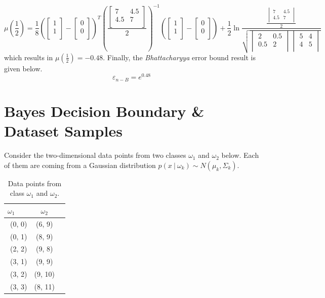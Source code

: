 \documentclass[12pt]{article}
\numberwithin{equation}{section}
\numberwithin{table}{section}
\numberwithin{figure}{section}
\newcommand{\eps}{\varepsilon}
\begin{document}
$$
	\mu(\frac{1}{2}) = \frac{1}{8}(\begin{bmatrix}
	1\\
	1\\
	\end{bmatrix} - \begin{bmatrix}
	0\\
	0\\
	\end{bmatrix})^T(\frac{\begin{bmatrix}
		7 & 4.5\\
		4.5 & 7\\
		\end{bmatrix}}{2})^{-1}(\begin{bmatrix}
	1\\
1\\
\end{bmatrix} - \begin{bmatrix}
0\\
0\\
\end{bmatrix}) + \frac{1}{2}\ln \frac{\frac{\begin{vmatrix}
		7 & 4.5\\
		4.5 & 7\\
		\end{vmatrix}}{2}}{\sqrt{\begin{vmatrix}
		2 & 0.5\\
		0.5 & 2\\
		\end{vmatrix}\begin{vmatrix}
		5 & 4\\
		4 & 5\\
		\end{vmatrix}}}
$$
which results in $\mu(\frac{1}{2}) = -0.48$. Finally, the \textit{Bhattacharyya} error bound result is given below.
$$
	\eps_{n-B} = e^{0.48}
$$

\section{Bayes Decision Boundary \& Dataset Samples}
Consider the two-dimensional data points from two classes $\omega_1$ and $\omega_2$ below. Each of them are coming from a Gaussian distribution $p(x\ |\ \omega_k) \sim N(\mu_k, \Sigma_k)$.

\begin{table}[!h] \centering
	\begin{tabular}{rcc}
		\hline
		$ \omega_1 $\ \ \ &
		$ \omega_2 $ &\\
		\hline
		(0, 0) & (6, 9)\\
		(0, 1) & (8, 9)\\
		(2, 2) & (9, 8)\\
		(3, 1) & (9, 9)\\
		(3, 2) & (9, 10)\\
		(3, 3) & (8, 11)\\
		\hline
	\end{tabular}
	\caption{Data points from class $\omega_1$ and $\omega_2$.}
	\label{tabconvdemo}
\end{table}
\end{document}
